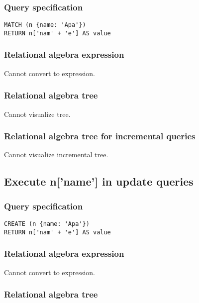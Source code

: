\subsubsection*{Query specification}

\begin{lstlisting}
MATCH (n {name: 'Apa'})
RETURN n['nam' + 'e'] AS value
\end{lstlisting}

\subsubsection*{Relational algebra expression}

Cannot convert to expression.

\subsubsection*{Relational algebra tree}

Cannot visualize tree.

\subsubsection*{Relational algebra tree for incremental queries}

Cannot visualize incremental tree.

\subsection{Execute n['name'] in update queries}

\subsubsection*{Query specification}

\begin{lstlisting}
CREATE (n {name: 'Apa'})
RETURN n['nam' + 'e'] AS value
\end{lstlisting}

\subsubsection*{Relational algebra expression}

Cannot convert to expression.

\subsubsection*{Relational algebra tree}


